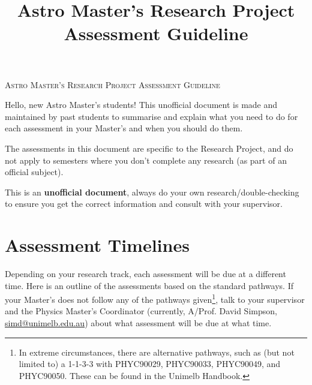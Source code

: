 \documentclass[11pt, oneside, a4paper]{article}
\title{Astro Master's Research Project Assessment Guideline}
\newcommand{\myboxcolor}{MidnightBlue}
\begin{document}
\pagestyle{fancy}
\thispagestyle{firstpage}                                      
{\centering \LARGE \textsc{Astro Master's Research Project Assessment Guideline} \\}
\vspace{0.5em}

Hello, new Astro Master's students!
This unofficial document is made and maintained by past students to summarise and explain what you need to do for each assessment in your Master's and when you should do them. 

\begin{tcolorbox}[colback=\myboxcolor!5!white,colframe=\myboxcolor!50!white,title=Note]
    The assessments in this document are specific to the Research Project, and do not apply to semesters where you don't complete any research (as part of an official subject).
\end{tcolorbox}

\begin{tcolorbox}[colback=red!5!white,colframe=red!50!white,title={IMPORTANT}]
    This is an \textbf{unofficial document}, always do your own research/double-checking to ensure you get the correct information and consult with your supervisor. 
\end{tcolorbox} 

\section*{Assessment Timelines}

Depending on your research track, each assessment will be due at a different time. 
Here is an outline of the assessments based on the standard pathways. 
If your Master's does not follow any of the pathways given\footnote{In extreme circumstances, there are alternative pathways, such as (but not limited to) a 1-1-3-3 with PHYC90029,
PHYC90033, PHYC90049, and PHYC90050. These can be found in the Unimelb Handbook.}, talk to your supervisor and the Physics Master's Coordinator (currently, A/Prof. David Simpson, \url{simd@unimelb.edu.au}) about what assessment will be due at what time.
\end{document}
